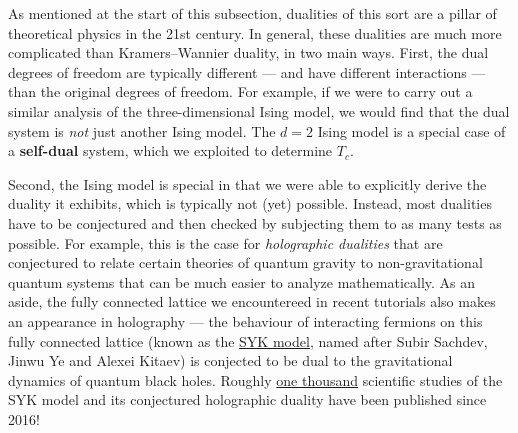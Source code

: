 As mentioned at the start of this subsection, dualities of this sort are a pillar of theoretical physics in the 21st century.
In general, these dualities are much more complicated than Kramers--Wannier duality, in two main ways.
First, the dual degrees of freedom are typically different --- and have different interactions --- than the original degrees of freedom.
For example, if we were to carry out a similar analysis of the three-dimensional Ising model, we would find that the dual system is \textit{not} just another Ising model. %
The $d = 2$ Ising model is a special case of a \textbf{self-dual} system, which we exploited to determine $T_c$.

Second, the Ising model is special in that we were able to explicitly derive the duality it exhibits, which is typically not (yet) possible.
Instead, most dualities have to be conjectured and then checked by subjecting them to as many tests as possible.
For example, this is the case for \textit{holographic dualities} that are conjectured to relate certain theories of quantum gravity to non-gravitational quantum systems that can be much easier to analyze mathematically.
As an aside, the fully connected lattice we encountereed in recent tutorials also makes an appearance in holography --- the behaviour of interacting fermions on this fully connected lattice (known as the \href{https://en.wikipedia.org/wiki/Sachdev-Ye-Kitaev_model}{SYK model}, named after Subir Sachdev, Jinwu Ye and Alexei Kitaev) is conjected to be dual to the gravitational dynamics of quantum black holes.
Roughly \href{https://inspirehep.net/literature/342314}{one thousand} scientific studies of the SYK model and its conjectured holographic duality have been published since 2016!
